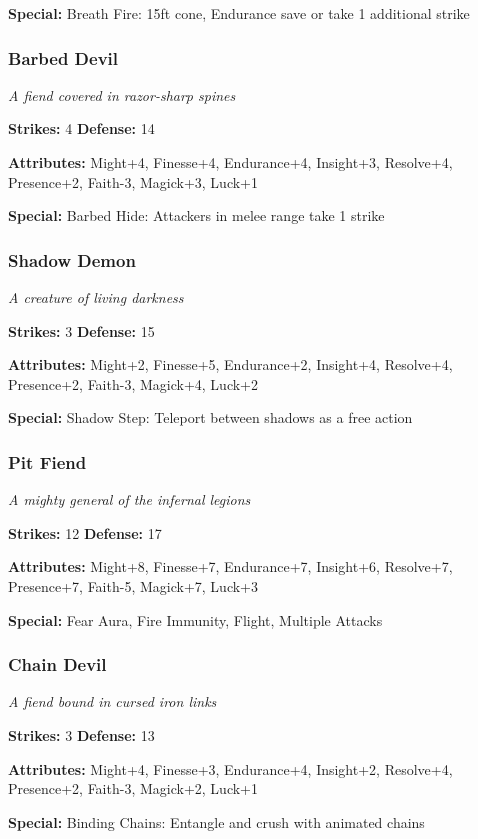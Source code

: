 \documentclass[10pt,twoside]{article}
\begin{document}
\textbf{Special:} Breath Fire: 15ft cone, Endurance save or take 1 additional strike

\subsubsection{Barbed Devil}
\textit{A fiend covered in razor-sharp spines}

\textbf{Strikes:} 4 \quad \textbf{Defense:} 14

\textbf{Attributes:} Might+4, Finesse+4, Endurance+4, Insight+3, Resolve+4, Presence+2, Faith-3, Magick+3, Luck+1

\textbf{Special:} Barbed Hide: Attackers in melee range take 1 strike

\subsubsection{Shadow Demon}
\textit{A creature of living darkness}

\textbf{Strikes:} 3 \quad \textbf{Defense:} 15

\textbf{Attributes:} Might+2, Finesse+5, Endurance+2, Insight+4, Resolve+4, Presence+2, Faith-3, Magick+4, Luck+2

\textbf{Special:} Shadow Step: Teleport between shadows as a free action

\subsubsection{Pit Fiend}
\textit{A mighty general of the infernal legions}

\textbf{Strikes:} 12 \quad \textbf{Defense:} 17

\textbf{Attributes:} Might+8, Finesse+7, Endurance+7, Insight+6, Resolve+7, Presence+7, Faith-5, Magick+7, Luck+3

\textbf{Special:} Fear Aura, Fire Immunity, Flight, Multiple Attacks

\subsubsection{Chain Devil}
\textit{A fiend bound in cursed iron links}

\textbf{Strikes:} 3 \quad \textbf{Defense:} 13

\textbf{Attributes:} Might+4, Finesse+3, Endurance+4, Insight+2, Resolve+4, Presence+2, Faith-3, Magick+2, Luck+1

\textbf{Special:} Binding Chains: Entangle and crush with animated chains
\end{document}
